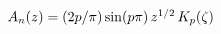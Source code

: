 $\mathop{A_{n}\/}\nolimits\!\left(z\right)=(2p/\pi)\mathop{\sin\/}\nolimits\!%
\left(p\pi\right)z^{1/2}\mathop{K_{p}\/}\nolimits\!\left(\zeta\right)$